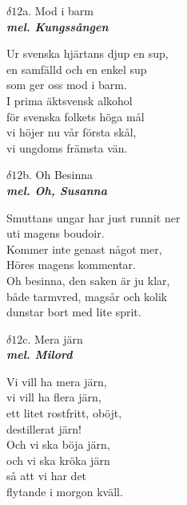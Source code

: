 \documentclass[a6paper,10pt]{article}
\newcommand{\mel}[1]{\small\textbf{\textit{mel. #1 \\}}}
\begin{document}
\setlength{\oddsidemargin}{-0.37in}
\noindent
\begin{center}
\Large $\delta12$a. Mod i barm\\ 
\mel{Kungssången}
\end{center}
Ur svenska hjärtans djup en sup, \\
en samfälld och en enkel sup \\
som ger oss mod i barm. \\
I prima äktsvensk alkohol \\
för svenska folkets höga mål \\
vi höjer nu vår första skål, \\
vi ungdoms främsta vän.
\begin{center}
\Large $\delta12$b. Oh Besinna\\ 
\mel{Oh, Susanna}
\end{center}
Smuttans ungar har just runnit ner \\
uti magens boudoir. \\
Kommer inte genast något mer, \\
Höres magens kommentar. \\
Oh besinna, den saken är ju klar, \\
både tarmvred, magsår och kolik \\
dunstar bort med lite sprit. 
\begin{center}
\Large $\delta12$c. Mera järn\\ 
\mel{Milord}
\end{center}
Vi vill ha mera järn, \\
vi vill ha flera järn, \\
ett litet rostfritt, oböjt, \\
destillerat järn! \\
Och vi ska böja järn, \\
och vi ska kröka järn \\
så att vi har det \\
flytande i morgon kväll.
\end{document}
